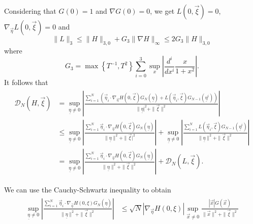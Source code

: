 \documentclass{article}
\newcommand\set[1]{\left\{ #1 \right\}}
\newcommand\ueta{{\underline \eta}}
\newcommand\vxi{{\vec \xi}}
\begin{document}
Considering that $G(0)=1$ and $\nabla G(0)=0$, we get $L(0,\vxi) = 0$, $\nabla_{\vec \eta} L(0,\vxi) =  0$ and
\[
\|L\|_3\leq \|H\|_{3,0}+G_3\|\nabla H\|_\infty\leq 2G_3  \|H\|_{3,0}
\]
where 
\[
G_3=\max\set{T^{-1},T^2}\sum_{i=0}^3\sup_x\left|\frac{d^i}{dx^i}\frac x{1+x^2}\right|.
\]
It follows that
\begin{align}\label{eq:FirstTriangleIn}
\begin{split}
\mathcal D_N(H,\vxi) &=\sup_{\underline\eta\ne0}\left|
\frac{\sum_{i = 1}^N \left(\vec \eta_i \cdot \nabla_{\vec \eta} H(0,\vxi)G_N(\underline\eta) +  L(\vec
\eta_i,\vxi)G_{N-1}(\underline\eta^i)\right)}{\|\ueta|^2 + \|\vxi\|^2}\right|\\ 
&\leq
\sup_{\underline\eta\ne0}\left| \frac{\sum_{i = 1}^N \vec \eta_i \cdot \nabla_{\vec \eta}
H(0,\vxi)G_{N}(\underline\eta) }{\|\ueta\|^2 + \|\vxi|^2}\right| + \sup_{\underline\eta\ne0}\left| \frac{\sum_{i
= 1}^N  L(\vec \eta_i,\vxi)G_{N-1}(\underline\eta^i)}{\|\ueta\|^2 + \|\vxi\|^2}\right|\\ 
&=
\sup_{\ueta\ne0}\left| \frac{\sum_{i = 1}^N \vec \eta_i \cdot \nabla_{\vec \eta} H(0,\vxi)G_N(\underline\eta)
}{\|\ueta\|^2 + \|\vxi\|^2}\right| + \mathcal D_N( L,\vxi).
\end{split}
\end{align}
	
We can use the Cauchy-Schwartz inequality to obtain
\begin{align}\label{eq:FirstHetaBound}
\begin{split}
\sup_{\underline\eta\ne0} \left| \frac{\sum_{i = 1}^N \vec \eta_i \cdot \nabla_{\vec \eta} H(0,\xi)G_N(\underline\eta) 
}{\|\ueta\|^2 + \|\vxi\|^2}\right| &\leq \sqrt{N} \left|\nabla_{\vec\eta} H(0,\xi)\right| \sup_{\vec x\ne 0} 
\frac{|\vec x| 
G(\vec x) }{\|\vec x\|^2 + \|\vxi\|^2}
\end{split}
\end{align}
	
\end{document}
